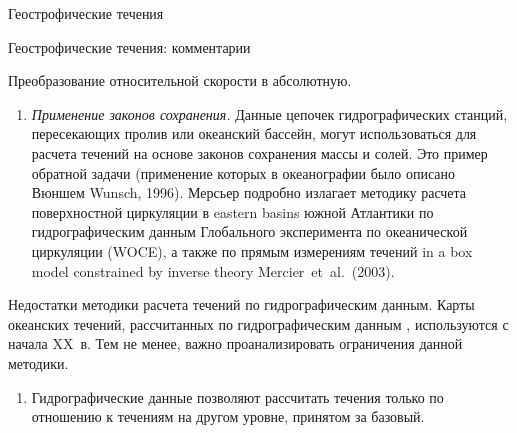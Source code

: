 \begin{chapter}{Геострофические течения}
\begin{section}{Геострофические течения: комментарии}
\begin{paragraph}{Преобразование относительной скорости в абсолютную. }
\begin{enumerate}
\item
\emph{Применение законов сохранения.} Данные цепочек гидрографических
станций, пересекающих пролив или 
океанский бассейн, могут использоваться для расчета течений на основе
законов сохранения массы и солей. Это пример обратной задачи (применение 
которых в океанографии было описано Вюншем Wunsch, 1996). 
Мерсьер подробно излагает методику расчета поверхностной
циркуляции в eastern basins южной Атлантики по гидрографическим данным 
Глобального эксперимента по океанической циркуляции (WOCE), 
а также по прямым измерениям течений in a box model 
constrained by inverse theory Mercier~et~al.~(2003).
%
\end{enumerate}
\end{paragraph}

\begin{paragraph}{Недостатки методики расчета течений по гидрографическим данным.}
Карты океанских течений, рассчитанных по гидрографическим данным%
,
используются с начала XX~в. Тем не менее, важно проанализировать
ограничения данной методики.
%

\begin{enumerate}
\item
Гидрографические данные
позволяют рассчитать течения только по отношению к течениям на другом уровне, 
принятом за базовый.
%


\end{enumerate}
\end{paragraph}
\end{section}
\end{chapter}
